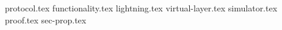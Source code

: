 \documentclass{llncs}
\begin{document}
\pagestyle{plain}
{protocol.tex}
{functionality.tex}
{lightning.tex}
{virtual-layer.tex}
{simulator.tex}
{proof.tex}
{sec-prop.tex}


\end{document}
